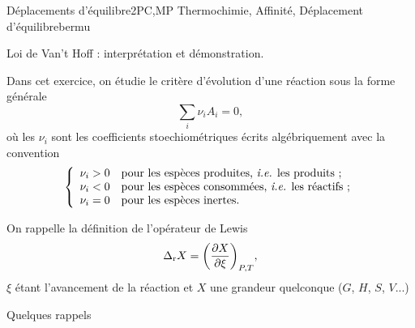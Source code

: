 \begin{exercise}{Déplacements d'équilibre}{2}{PC,MP}
{Thermochimie, Affinité, Déplacement d'équilibre}{bermu}


\begin{questions}
    \questioncours Loi de Van't Hoff : interprétation et démonstration.
    
\begin{EnvUplevel}
    Dans cet exercice, on étudie le critère d'évolution d'une réaction sous la forme générale
    \begin{equation}
        \sum_i\nu_i A_i = 0, \tag*{de constante $K^\circ(T)$}
    \end{equation}
    où les $\nu_i$ sont les coefficients stoechiométriques écrits algébriquement avec la convention
    $$\left\lbrace\begin{array}{ll}
        \nu_i > 0 & \text{pour les espèces produites, \emph{i.e.} les produits ;}  \\
        \nu_i < 0 & \text{pour les espèces consommées, \emph{i.e.} les réactifs ;}  \\
        \nu_i = 0 & \text{pour les espèces inertes.}  \\ 
    \end{array}\right.$$
    
    On rappelle la définition de l'opérateur de Lewis $$\Delta_\text{r}X = \qty(\pdv{X}{\xi})_{P,T},$$
    $\xi$ étant l'avancement de la réaction et $X$ une grandeur quelconque ($G$, $H$, $S$, $V$...)
\end{EnvUplevel}
    \question \textsf{Quelques rappels}
    
    

\end{questions}
\end{exercise}
